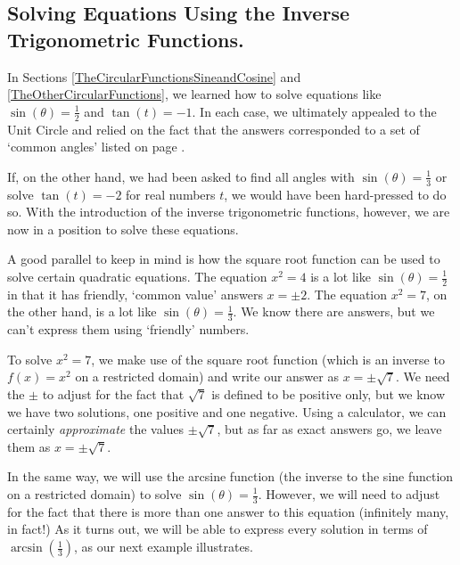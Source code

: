 \subsection{Solving Equations Using the Inverse Trigonometric Functions.}

In Sections \ref{TheCircularFunctionsSineandCosine} and \ref{TheOtherCircularFunctions}, we learned how to solve equations like $\sin(\theta) = \frac{1}{2}$  and $\tan(t) = -1$. In each case, we ultimately appealed to the Unit Circle and relied on the fact that the answers corresponded to a set of `common angles' listed on page \pageref{commonanglesunitcircle}. 

\smallskip

 If, on the other hand, we had been asked to find all angles with $\sin(\theta) = \frac{1}{3}$ or solve $\tan(t) = -2$ for real numbers $t$, we would have been hard-pressed to do so.  With the introduction of the inverse trigonometric functions, however, we are now in a position to solve these equations. 
 
 \smallskip
 
 A good parallel to keep in mind is how the square root function can be used to solve certain quadratic equations.  The equation $x^2 = 4$ is a lot like  $\sin(\theta) = \frac{1}{2}$ in that it has friendly, `common value' answers  $x = \pm 2$.   The equation $x^2 = 7$, on the other hand, is a lot like $\sin(\theta) = \frac{1}{3}$.  We know there are answers, but we can't express them using `friendly' numbers.  
 
 \smallskip
 
 To solve $x^2 = 7$, we make use of the square root function (which is an inverse to $f(x) = x^2$ on a restricted domain) and write our answer as  $x = \pm \sqrt{7}$.  We need  the $\pm$ to  adjust for the fact that $\sqrt{7}$ is defined to be positive only, but we know we have two solutions, one positive and one negative.    Using a  calculator, we can certainly \textit{approximate} the values $\pm \sqrt{7}$,  but as far as exact answers go, we leave them as $x = \pm \sqrt{7}$.  
  
  \smallskip
  
In the same way, we will use the arcsine function (the inverse to the sine function on a restricted domain)  to solve $\sin(\theta) = \frac{1}{3}$.  However, we will need to adjust for the fact that there is more than one answer to this equation (infinitely many, in fact!)  As it turns out, we will be able to express every solution in terms of $\arcsin\left(\frac{1}{3}\right)$, as our next example illustrates.

